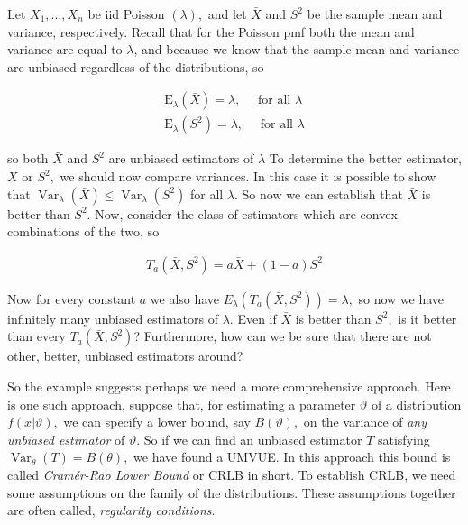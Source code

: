\documentclass[ 11pt,%
				a4paper,%
				twoside,%
				headinclude,%
				footinclude = true,%
				cleardoublepage = empty,%
				reqno]{scrbook}
\begin{document}
\begin{example}
Let $X_{1}, \ldots, X_{n}$ be iid Poisson $(\lambda),$ and let $\bar{X}$ and $S^{2}$ be the sample mean and variance, respectively. Recall that for the Poisson pmf both the mean and variance are equal to $\lambda$, and because we know that the sample mean and variance are unbiased regardless of the distributions, so

\begin{align*}
  \mathrm{E}_{\lambda} (\bar{X})=\lambda, \quad \text { for all } \lambda \\
  \mathrm{E}_{\lambda} (S^{2})=\lambda, \quad \text { for all } \lambda
\end{align*}



so both $\bar{X}$ and $S^{2}$ are unbiased estimators of $\lambda$ To determine the better estimator, $\bar{X}$ or $S^{2},$ we should now compare variances. In this case it is possible to show that $\operatorname{Var}_{\lambda} \left(\bar{X}\right) \leq \operatorname{Var}_{\lambda} \left( S^{2} \right)$ for all $\lambda$. So now we can establish that $\bar{X}$ is better than $S^{2}$. Now, consider the class of estimators which are convex combinations of the two, so 

\begin{align*}
  T_{a}\left(\bar{X}, S^{2}\right)=a \bar{X}+(1-a) S^{2}
\end{align*}

Now for every constant $a$ we also have $E_{\lambda} (T_{a}\left(\bar{X}, S^{2}\right))=\lambda,$ so now we have infinitely many unbiased estimators of $\lambda$. Even if $\bar{X}$ is better than $S^{2},$ is it better than every $T_{a}\left(\bar{X}, S^{2}\right)$? Furthermore, how can we be sure that there are not other, better, unbiased estimators around?
\end{example}


So the example suggests perhaps we need a more comprehensive approach. Here is one such approach, suppose that, for estimating a parameter $\vartheta$ of a distribution $f(x | \vartheta),$ we can specify a lower bound, say $B(\vartheta),$ on the variance of \emph{any unbiased estimator} of $\vartheta$. So if we can find an unbiased estimator $T$ satisfying $\operatorname{Var}_{\theta}(T)=B(\theta),$ we have found a UMVUE. In this approach this bound is called \emph{Cramér-Rao Lower Bound} or CRLB in short. To establish CRLB, we need some assumptions on the family of the distributions. These assumptions together are often called, \emph{regularity conditions}. 
\end{document}
